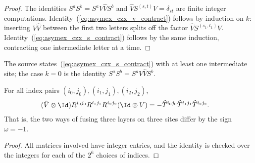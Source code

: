 \begin{proof}
    \leanok
    The identities $S^aS^b=S^aV\hat VS^b$ and
    $\hat VS^{(s,t)}V=\delta_{st}$ are finite integer computations.
    Identity~(\ref{eq:asymex_czx_v_contract}) follows by induction on $k$:
    inserting $V\hat V$ between the first two letters splits off the factor
    $\hat VS^{(s_1,t_1)}V$. Identity~(\ref{eq:asymex_czx_s_contract}) follows by
    the same induction, contracting one intermediate letter at a time.
\end{proof}

The source states~(\ref{eq:asymex_czx_s_contract}) with at least one intermediate site;
the case $k=0$ is the identity $S^aS^b=S^aV\hat VS^b$.

\begin{lemma}
    \label{thm:asymex_czx_decorated_associator}
    \leanok
    For all index pairs $(i_0,j_0),(i_1,j_1),(i_2,j_2)$,
    \begin{align}
        (\hat V\otimes\Id)R^{i_0j_0}R^{i_1j_1}R^{i_2j_2}(\Id\otimes V)
         & =-\widehat T^{i_0j_0}\widehat T^{i_1j_1}\widehat T^{i_2j_2}.
        \notag
    \end{align}
    That is, the two ways of fusing three layers on three sites differ by
    the sign $\omega=-1$.
\end{lemma}

\begin{proof}
    \leanok
    All matrices involved have integer entries, and the identity is checked
    over the integers for each of the $2^6$ choices of indices.
\end{proof}

